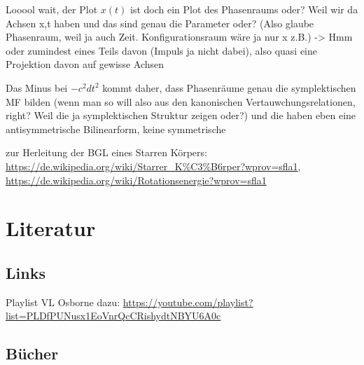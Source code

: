 Looool wait, der Plot $x(t)$ ist doch ein Plot des Phasenraums oder? Weil wir da Achsen x,t haben und das sind genau die Parameter oder? (Also glaube Phasenraum, weil ja auch Zeit. Konfigurationsraum wäre ja nur x z.B.) -> Hmm oder zumindest eines Teils davon (Impuls ja nicht dabei), also quasi eine Projektion davon auf gewisse Achsen


Das Minus bei $-c^2dt^2$ kommt daher, dass Phasenräume genau die symplektischen MF bilden (wenn man so will also aus den kanonischen Vertauwchungsrelationen, right? Weil die ja symplektischen Struktur zeigen oder?) und die haben eben eine antisymmetrische Bilinearform, keine symmetrische


zur Herleitung der BGL eines Starren Körpers: \url{https://de.wikipedia.org/wiki/Starrer_K%C3%B6rper?wprov=sfla1}, \url{https://de.wikipedia.org/wiki/Rotationsenergie?wprov=sfla1}


	\section{Literatur}
		\subsection{Links}
Playlist VL Osborne dazu: \url{https://youtube.com/playlist?list=PLDfPUNusx1EoVnrQcCRishydtNBYU6A0c}

		\subsection{Bücher}


\printindex


